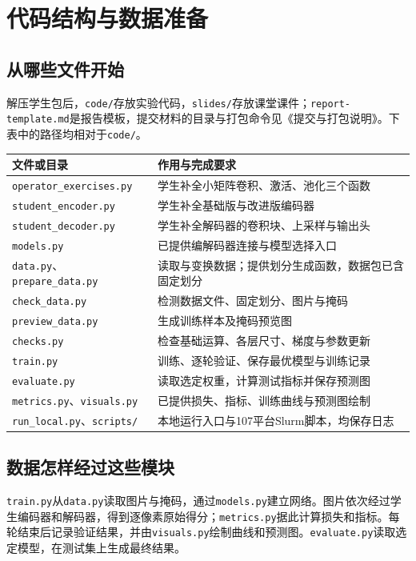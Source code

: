 \documentclass[UTF8,a4paper,11pt,fontset=fandol]{ctexart}
\newcommand{\file}[1]{\nolinkurl{#1}}
\begin{document}
\section{代码结构与数据准备}
\subsection{从哪些文件开始}
解压学生包后，\file{code/}存放实验代码，\file{slides/}存放课堂课件；\file{report-template.md}是报告模板，提交材料的目录与打包命令见《提交与打包说明》。下表中的路径均相对于\file{code/}。

\par\noindent\begin{tabularx}{\linewidth}{L{5.2cm}Y}\toprule
文件或目录 & 作用与完成要求\\\midrule
\file{operator_exercises.py} & 学生补全小矩阵卷积、激活、池化三个函数\\
\file{student_encoder.py} & 学生补全基础版与改进版编码器\\
\file{student_decoder.py} & 学生补全解码器的卷积块、上采样与输出头\\
\file{models.py} & 已提供编解码器连接与模型选择入口\\
\file{data.py}、\file{prepare_data.py} & 读取与变换数据；提供划分生成函数，数据包已含固定划分\\
\file{check_data.py} & 检测数据文件、固定划分、图片与掩码\\
\file{preview_data.py} & 生成训练样本及掩码预览图\\
\file{checks.py} & 检查基础运算、各层尺寸、梯度与参数更新\\
\file{train.py} & 训练、逐轮验证、保存最优模型与训练记录\\
\file{evaluate.py} & 读取选定权重，计算测试指标并保存预测图\\
\file{metrics.py}、\file{visuals.py} & 已提供损失、指标、训练曲线与预测图绘制\\
\file{run_local.py}、\file{scripts/} & 本地运行入口与107平台Slurm脚本，均保存日志\\
\bottomrule
\end{tabularx}\par

\subsection{数据怎样经过这些模块}
\file{train.py}从\file{data.py}读取图片与掩码，通过\file{models.py}建立网络。图片依次经过学生编码器和解码器，得到逐像素原始得分；\file{metrics.py}据此计算损失和指标。每轮结束后记录验证结果，并由\file{visuals.py}绘制曲线和预测图。\file{evaluate.py}读取选定模型，在测试集上生成最终结果。
\end{document}
